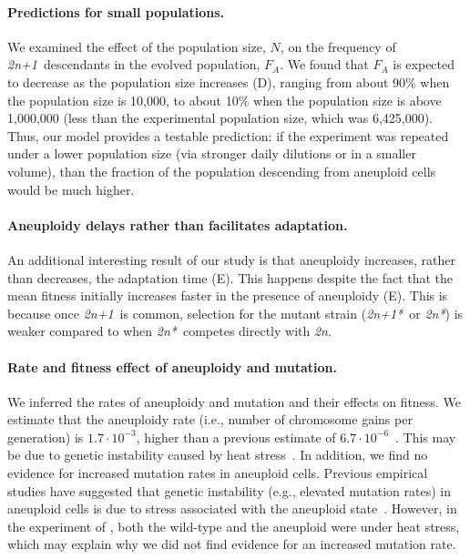 \documentclass[12pt]{extarticle}
\newcommand{\euwt}{\emph{2n}}
\newcommand{\anwt}{\emph{2n+1}}
\newcommand{\eumt}{\emph{2n*}}
\newcommand{\anmt}{\emph{2n+1*}}
\begin{document}
\paragraph{Predictions for small populations.}
We examined the effect of the population size, $N$, on the frequency of \anwt\ descendants in the evolved population, $F_A$.
We found that $F_A$ is expected to decrease as the population size increases (D), ranging from about 90\% when the population size is 10,000, to about 10\% when the population size is above 1,000,000 (less than the experimental population size, which was 6,425,000). 
Thus, our model provides a testable prediction: if the experiment was repeated under a lower population size (via stronger daily dilutions or in a smaller volume), than the fraction of the population descending from aneuploid cells would be much higher.

\paragraph{Aneuploidy delays rather than facilitates adaptation.}
An additional interesting result of our study is that aneuploidy increases, rather than decreases, the adaptation time (E). 
This happens despite the fact that the mean fitness initially increases faster in the presence of aneuploidy (E). 
This is because once \anwt\ is common, selection for the mutant strain (\anmt\ or \eumt) is weaker compared to when \eumt\ competes directly with \euwt.

\paragraph{Rate and fitness effect of aneuploidy and mutation.}
We inferred the rates of aneuploidy and mutation and their effects on fitness. 
We estimate that the aneuploidy rate (i.e., number of chromosome gains per generation) is $1.7 \cdot 10^{-3}$, higher than a previous estimate of $6.7 \cdot 10^{-6}$~\citep{Zhu2016}. This may be due to genetic instability caused by heat stress~\citep{Chen2012a}.
In addition, we find no evidence for increased mutation rates in aneuploid cells. 
Previous empirical studies have suggested that genetic instability (e.g., elevated mutation rates) in aneuploid cells is due to stress associated with the aneuploid state~\citep{Bouchonville2009, Chen2012b, Zhu2012, Ippolito2021b}.
However, in the experiment of \citet{Yona2012}, both the wild-type and the aneuploid were under heat stress, which may explain why we did not find evidence for an increased mutation rate.
\end{document}
